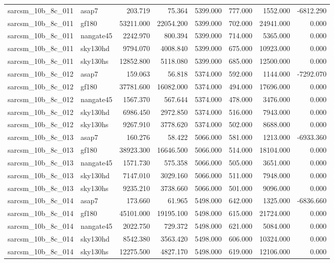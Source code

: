\begin{tabular}{llrrrrrr}
sarcsm\_10b\_8c\_011 & asap7 & 203.719 & 75.364 & 5399.000 & 777.000 & 1552.000 & -6812.290 \\
sarcsm\_10b\_8c\_011 & gf180 & 53211.000 & 22054.200 & 5399.000 & 702.000 & 24941.000 & 0.000 \\
sarcsm\_10b\_8c\_011 & nangate45 & 2242.970 & 800.394 & 5399.000 & 714.000 & 5365.000 & 0.000 \\
sarcsm\_10b\_8c\_011 & sky130hd & 9794.070 & 4008.840 & 5399.000 & 675.000 & 10923.000 & 0.000 \\
sarcsm\_10b\_8c\_011 & sky130hs & 12852.800 & 5118.080 & 5399.000 & 685.000 & 12500.000 & 0.000 \\
sarcsm\_10b\_8c\_012 & asap7 & 159.063 & 56.818 & 5374.000 & 592.000 & 1144.000 & -7292.070 \\
sarcsm\_10b\_8c\_012 & gf180 & 37781.600 & 16082.000 & 5374.000 & 494.000 & 17696.000 & 0.000 \\
sarcsm\_10b\_8c\_012 & nangate45 & 1567.370 & 567.644 & 5374.000 & 478.000 & 3476.000 & 0.000 \\
sarcsm\_10b\_8c\_012 & sky130hd & 6986.450 & 2972.850 & 5374.000 & 516.000 & 7943.000 & 0.000 \\
sarcsm\_10b\_8c\_012 & sky130hs & 9267.910 & 3778.620 & 5374.000 & 502.000 & 8688.000 & 0.000 \\
sarcsm\_10b\_8c\_013 & asap7 & 160.276 & 58.422 & 5066.000 & 581.000 & 1213.000 & -6933.360 \\
sarcsm\_10b\_8c\_013 & gf180 & 38923.300 & 16646.500 & 5066.000 & 514.000 & 18104.000 & 0.000 \\
sarcsm\_10b\_8c\_013 & nangate45 & 1571.730 & 575.358 & 5066.000 & 505.000 & 3651.000 & 0.000 \\
sarcsm\_10b\_8c\_013 & sky130hd & 7147.010 & 3029.160 & 5066.000 & 511.000 & 7948.000 & 0.000 \\
sarcsm\_10b\_8c\_013 & sky130hs & 9235.210 & 3738.660 & 5066.000 & 501.000 & 9096.000 & 0.000 \\
sarcsm\_10b\_8c\_014 & asap7 & 173.660 & 61.965 & 5498.000 & 642.000 & 1325.000 & -6836.660 \\
sarcsm\_10b\_8c\_014 & gf180 & 45101.000 & 19195.100 & 5498.000 & 615.000 & 21724.000 & 0.000 \\
sarcsm\_10b\_8c\_014 & nangate45 & 2022.750 & 729.372 & 5498.000 & 621.000 & 5084.000 & 0.000 \\
sarcsm\_10b\_8c\_014 & sky130hd & 8542.380 & 3563.420 & 5498.000 & 606.000 & 10324.000 & 0.000 \\
sarcsm\_10b\_8c\_014 & sky130hs & 12275.500 & 4827.170 & 5498.000 & 619.000 & 12106.000 & 0.000 \\

\end{tabular}
